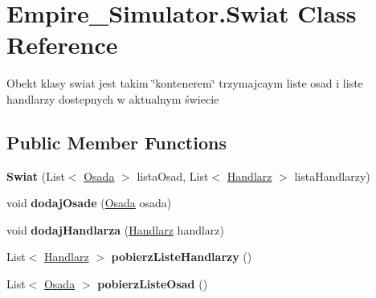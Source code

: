 \hypertarget{class_empire___simulator_1_1_swiat}{\section{Empire\+\_\+\+Simulator.\+Swiat Class Reference}
\label{class_empire___simulator_1_1_swiat}
}


Obekt klasy swiat jest takim \char`\"{}kontenerem\char`\"{} trzymajcaym liste osad i liste handlarzy dostepnych w aktualnym świecie  


\subsection*{Public Member Functions}
\begin{DoxyCompactItemize}
\item 
\hypertarget{class_empire___simulator_1_1_swiat_a1c15c0646552179b890ff084367739f4}{{\bfseries Swiat} (List$<$ \hyperlink{class_empire___simulator_1_1_osada}{Osada} $>$ lista\+Osad, List$<$ \hyperlink{class_empire___simulator_1_1_handlarz}{Handlarz} $>$ lista\+Handlarzy)}\label{class_empire___simulator_1_1_swiat_a1c15c0646552179b890ff084367739f4}

\item 
\hypertarget{class_empire___simulator_1_1_swiat_ab33f910469e0e57c26c9815a4b388803}{void {\bfseries dodaj\+Osade} (\hyperlink{class_empire___simulator_1_1_osada}{Osada} osada)}\label{class_empire___simulator_1_1_swiat_ab33f910469e0e57c26c9815a4b388803}

\item 
\hypertarget{class_empire___simulator_1_1_swiat_ad8f446dc6f49d9d9486196b3d0976928}{void {\bfseries dodaj\+Handlarza} (\hyperlink{class_empire___simulator_1_1_handlarz}{Handlarz} handlarz)}\label{class_empire___simulator_1_1_swiat_ad8f446dc6f49d9d9486196b3d0976928}

\item 
\hypertarget{class_empire___simulator_1_1_swiat_af29f44d2f029fdd2d88020f637481428}{List$<$ \hyperlink{class_empire___simulator_1_1_handlarz}{Handlarz} $>$ {\bfseries pobierz\+Liste\+Handlarzy} ()}\label{class_empire___simulator_1_1_swiat_af29f44d2f029fdd2d88020f637481428}

\item 
\hypertarget{class_empire___simulator_1_1_swiat_a3309a2122299ea8483639aadd5eb075f}{List$<$ \hyperlink{class_empire___simulator_1_1_osada}{Osada} $>$ {\bfseries pobierz\+Liste\+Osad} ()}\label{class_empire___simulator_1_1_swiat_a3309a2122299ea8483639aadd5eb075f}

\end{DoxyCompactItemize}



